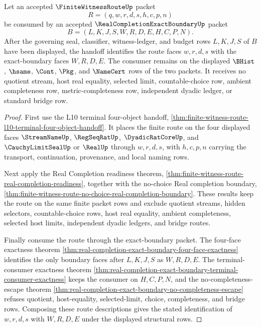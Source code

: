 \begin{theorem}
\label{thm:finite-witness-route-real-completion-exact-boundary-handoff}
Let an accepted $\FiniteWitnessRouteUp$ packet
$$
R=(q,w,r,d,s,h,c,p,n)
$$
be consumed by an accepted $\RealCompletionExactBoundaryUp$ packet
$$
B=(L,K,J,S,W,R,D,E,H,C,P,N).
$$
After the governing seal, classifier, witness-ledger, and budget rows $L,K,J,S$ of $B$ have been displayed, the handoff identifies the route faces $w,r,d,s$ with the exact-boundary faces $W,R,D,E$. The consumer remains on the displayed $\BHist$, $\hsame$, $\Cont$, $\Pkg$, and $\NameCert$ rows of the two packets. It receives no quotient stream, host real equality, selected limit, countable-choice row, ambient completeness row, metric-completeness row, independent dyadic ledger, or standard bridge row.
\end{theorem}
\begin{proof}
First use the L10 terminal four-object handoff, \autoref{thm:finite-witness-route-l10-terminal-four-object-handoff}. It places the finite route on the four displayed faces $\StreamNameUp$, $\RegSeqRatUp$, $\DyadicRatCoreUp$, and $\CauchyLimitSealUp$ or $\RealUp$ through $w,r,d,s$, with $h,c,p,n$ carrying the transport, continuation, provenance, and local naming rows.

Next apply the Real Completion readiness theorem, \autoref{thm:finite-witness-route-real-completion-readiness}, together with the no-choice Real completion boundary, \autoref{thm:finite-witness-route-no-choice-real-completion-boundary}. These results keep the route on the same finite packet rows and exclude quotient streams, hidden selectors, countable-choice rows, host real equality, ambient completeness, selected host limits, independent dyadic ledgers, and bridge routes.

Finally consume the route through the exact-boundary packet. The four-face exactness theorem \autoref{thm:real-completion-exact-boundary-four-face-exactness} identifies the only boundary faces after $L,K,J,S$ as $W,R,D,E$. The terminal-consumer exactness theorem \autoref{thm:real-completion-exact-boundary-terminal-consumer-exactness} keeps the consumer on $H,C,P,N$, and the no-completeness-escape theorem \autoref{thm:real-completion-exact-boundary-no-completeness-escape} refuses quotient, host-equality, selected-limit, choice, completeness, and bridge rows. Composing these route descriptions gives the stated identification of $w,r,d,s$ with $W,R,D,E$ under the displayed structural rows.
\end{proof}

